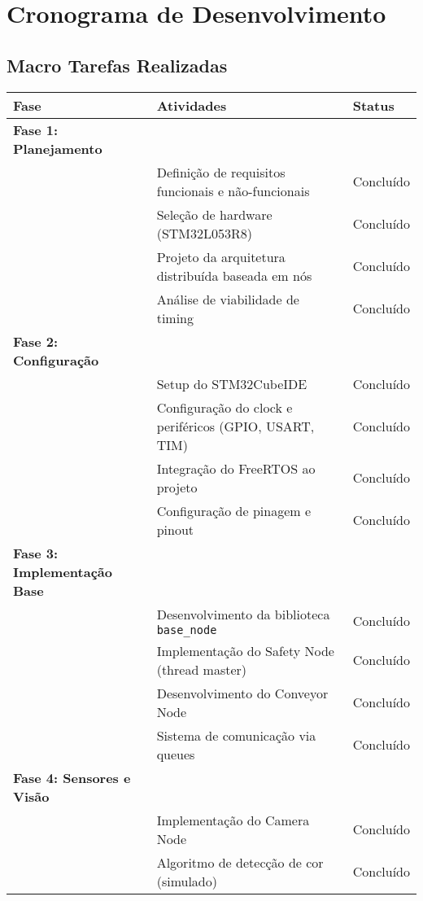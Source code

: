 \documentclass[12pt,a4paper]{article}
\begin{document}
\section{Cronograma de Desenvolvimento}

\subsection{Macro Tarefas Realizadas}

\begin{table}[H]
\centering
\begin{tabularx}{\textwidth}{lXl}
\toprule
\textbf{Fase} & \textbf{Atividades} & \textbf{Status} \\
\midrule
\textbf{Fase 1: Planejamento} & & \\
& Definição de requisitos funcionais e não-funcionais & Concluído \\
& Seleção de hardware (STM32L053R8) & Concluído \\
& Projeto da arquitetura distribuída baseada em nós & Concluído \\
& Análise de viabilidade de timing & Concluído \\
\midrule
\textbf{Fase 2: Configuração} & & \\
& Setup do STM32CubeIDE & Concluído \\
& Configuração do clock e periféricos (GPIO, USART, TIM) & Concluído \\
& Integração do FreeRTOS ao projeto & Concluído \\
& Configuração de pinagem e pinout & Concluído \\
\midrule
\textbf{Fase 3: Implementação Base} & & \\
& Desenvolvimento da biblioteca \texttt{base\_node} & Concluído \\
& Implementação do Safety Node (thread master) & Concluído \\
& Desenvolvimento do Conveyor Node & Concluído \\
& Sistema de comunicação via queues & Concluído \\
\midrule
\textbf{Fase 4: Sensores e Visão} & & \\
& Implementação do Camera Node & Concluído \\
& Algoritmo de detecção de cor (simulado) & Concluído \\

\end{tabularx}
\end{table}
\end{document}
